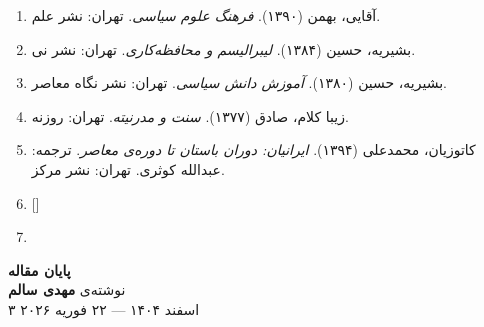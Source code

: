 \begin{enumerate}[leftmargin=2em, label=\arabic*., resume]

\item آقایی، بهمن (۱۳۹۰). \textit{فرهنگ علوم سیاسی}. تهران: نشر علم.

\item بشیریه، حسین (۱۳۸۴). \textit{لیبرالیسم و محافظه‌کاری}. تهران: نشر نی.

\item بشیریه، حسین (۱۳۸۰). \textit{آموزش دانش سیاسی}. تهران: نشر نگاه معاصر.

\item زیبا کلام، صادق (۱۳۷۷). \textit{سنت و مدرنیته}. تهران: روزنه.

\item کاتوزیان، محمدعلی (۱۳۹۴). \textit{ایرانیان: دوران باستان تا دوره‌ی معاصر}. ترجمه: عبدالله کوثری. تهران: نشر مرکز.

\item {} []
\item {}

\end{enumerate}

\vspace{1cm}
\begin{center}
\begin{tcolorbox}[enhanced, width=10cm, colback=BgWarm,
  colframe=AccentGold, rounded corners, drop shadow]
\centering
{\large\bfseries\color{PrimaryDeep}پایان مقاله}\\[0.3cm]
{\small\color{NeutralDark}
نوشته‌ی \textbf{مهدی سالم}\\
۳ اسفند ۱۴۰۴ — ۲۲ فوریه ۲۰۲۶\\[0.2cm]
}
\end{tcolorbox}
\end{center}
